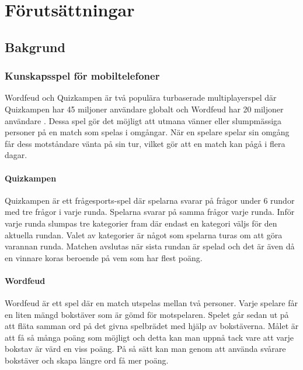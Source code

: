 \documentclass[a4paper, 11pt]{article}
\begin{document}
\section{Förutsättningar}

\subsection{Bakgrund}

\subsubsection{Kunskapsspel för mobiltelefoner}
Wordfeud och Quizkampen är två populära turbaserade multiplayerspel där Quizkampen har 45 miljoner användare globalt \cite{quiz} och Wordfeud har 20 miljoner användare \cite{wordfeud}. Dessa spel gör det möjligt att utmana vänner eller slumpmässiga personer på en match som spelas i omgångar. När en spelare spelar sin omgång får dess motståndare vänta på sin tur, vilket gör att en match kan pågå i flera dagar.

\paragraph{Quizkampen \newline} 
Quizkampen \cite{aboutquiz} är ett frågesports-spel där spelarna svarar på frågor under 6 rundor med tre frågor i varje runda. Spelarna svarar på samma frågor varje runda.  Inför varje runda slumpas tre kategorier fram där endast en kategori väljs för den aktuella rundan. Valet av kategorier är något som spelarna turas om att göra varannan runda. Matchen avslutas när sista rundan är spelad och det är även då en vinnare koras beroende på vem som har flest poäng. 

\paragraph{Wordfeud \newline}
Wordfeud \cite{aboutwordfeud} är ett spel där en match utspelas mellan två personer. Varje spelare får en liten mängd bokstäver som är gömd för motspelaren. Spelet går sedan ut på att fläta samman ord på det givna spelbrädet med hjälp av bokstäverna. Målet är att få så många poäng som möjligt och detta kan man uppnå tack vare att varje bokstav är värd en viss poäng. På så sätt kan man genom att använda svårare bokstäver och skapa längre ord få mer poäng. 
\end{document}
